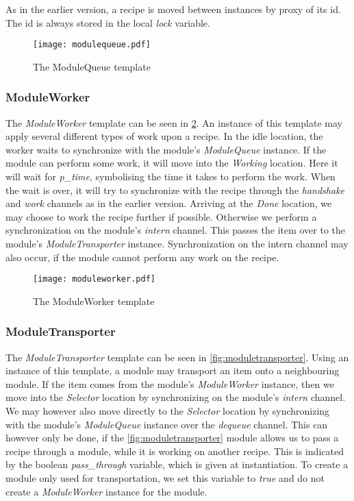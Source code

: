 As in the earlier version, a recipe is moved between instances by proxy of its id. The id is always stored in the local \emph{lock} variable.   

\begin{figure}[h]
\centering
\texttt{[image: modulequeue.pdf]}
\caption{The ModuleQueue template}
\label{fig:modulequeue}
\end{figure}


\subsubsection{ModuleWorker}\label{subs:moduleworker}
The \emph{ModuleWorker} template can be seen in \cref{fig:moduleworker}. An instance of this template may apply several different types of work upon a recipe. In the idle location, the worker waits to synchronize with the module's \emph{ModuleQueue} instance. If the module can perform some work, it will move into the \emph{Working} location. Here it will wait for \emph{p\_time}, symbolising the time it takes to perform the work. When the wait is over, it will try to synchronize with the recipe through the \emph{handshake} and \emph{work} channels as in the earlier version. Arriving at the \emph{Done}  location, we may choose to work the recipe further if possible. Otherwise we perform a synchronization on the module's \emph{intern} channel. This passes the item over to the module's \emph{ModuleTransporter} instance. Synchronization on the intern channel may also occur, if the module cannot perform any work on the recipe. 

\begin{figure}[h]
\centering
\texttt{[image: moduleworker.pdf]}
\caption{The ModuleWorker template}
\label{fig:moduleworker}
\end{figure}

\subsubsection{ModuleTransporter}
The \emph{ModuleTransporter} template can be seen in \cref{fig:moduletransporter}. Using an instance of this template, a module may transport an item onto a neighbouring module. If the item comes from the module's \emph{ModuleWorker} instance, then we move into the \emph{Selector} location by synchronizing on the module's \emph{intern} channel. We may however also move directly to the \emph{Selector} location by synchronizing with the module's \emph{ModuleQueue} instance over the \emph{dequeue} channel. This can however only be done, if the \cref{fig:moduletransporter} module allows us to pass a recipe through a module, while it is working on another recipe. This is indicated by the boolean \emph{pass\_through} variable, which is given at instantiation. To create a module only used for transportation, we set this variable to \emph{true} and do not create a \emph{ModuleWorker} instance for the module. 

